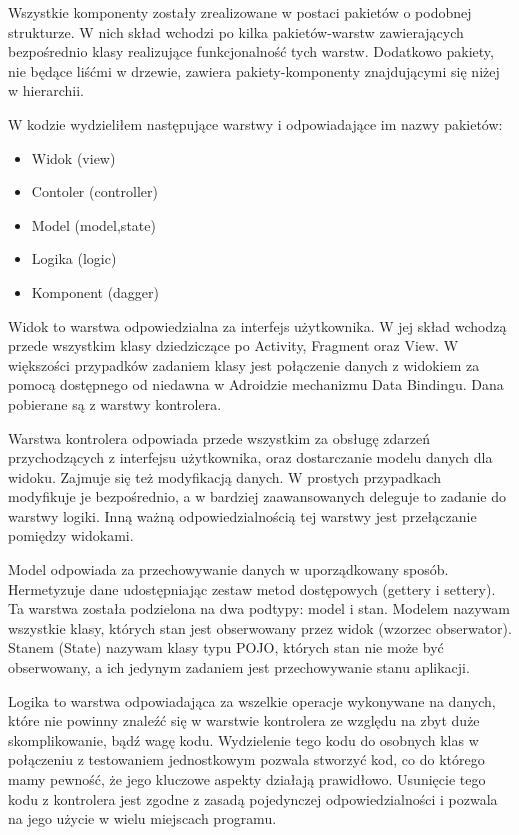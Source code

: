 \documentclass{xmgr}
\begin{document}
Wszystkie komponenty zostały zrealizowane w postaci pakietów o podobnej strukturze. W nich skład wchodzi po kilka pakietów-warstw zawierających bezpośrednio klasy realizujące funkcjonalność tych warstw. Dodatkowo pakiety, nie będące liśćmi w drzewie, zawiera pakiety-komponenty znajdującymi się niżej w hierarchii.

W kodzie wydzieliłem następujące warstwy i odpowiadające im nazwy pakietów:
\begin{itemize}
	\item Widok (view)
	\item Contoler (controller)
	\item Model (model,state)
	\item Logika (logic)
	\item Komponent (dagger)
\end{itemize}

Widok to warstwa odpowiedzialna za interfejs użytkownika. W jej skład wchodzą przede wszystkim klasy dziedziczące po Activity, Fragment oraz View. W większości przypadków zadaniem klasy jest połączenie danych z widokiem za pomocą dostępnego od niedawna w Adroidzie mechanizmu Data Bindingu. Dana pobierane  są z warstwy kontrolera.

Warstwa kontrolera odpowiada przede wszystkim za obsługę zdarzeń przychodzących z interfejsu użytkownika, oraz dostarczanie modelu danych dla widoku. Zajmuje się też modyfikacją danych. W prostych przypadkach modyfikuje je bezpośrednio, a w bardziej zaawansowanych deleguje to zadanie do warstwy logiki. Inną ważną odpowiedzialnością tej warstwy jest przełączanie pomiędzy widokami. 

Model odpowiada za przechowywanie danych w uporządkowany sposób. Hermetyzuje dane udostępniając zestaw metod dostępowych (gettery i settery). Ta warstwa została podzielona na dwa podtypy: model i stan. Modelem nazywam wszystkie klasy, których stan jest obserwowany przez widok (wzorzec obserwator). Stanem (State) nazywam klasy typu POJO, których stan nie może być obserwowany, a ich jedynym zadaniem jest przechowywanie stanu aplikacji. 

Logika to warstwa odpowiadająca za wszelkie operacje wykonywane na danych, które nie powinny znaleźć się w warstwie kontrolera ze względu na zbyt duże skomplikowanie, bądź wagę kodu. Wydzielenie tego kodu do osobnych klas w połączeniu z testowaniem jednostkowym pozwala stworzyć kod, co do którego mamy pewność, że jego kluczowe aspekty działają prawidłowo. Usunięcie tego kodu z kontrolera jest zgodne z zasadą pojedynczej odpowiedzialności \cite{CleanCode:2005} i pozwala na jego użycie w wielu miejscach programu. 
\end{document}
